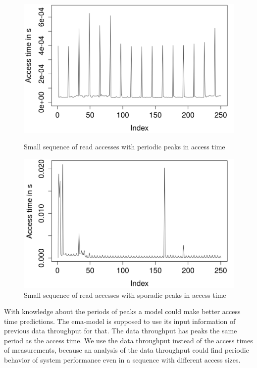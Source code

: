 \documentclass{superfri}
\begin{document}
	\begin{figure}[t]
		\centering
		\begin{minipage}[b]{0.47\textwidth}
			\includegraphics[width=\textwidth]{src/periodic_peaks.png}
			\caption{Small sequence of read accesses with periodic peaks in access time}
			\label{periodic}
		\end{minipage}
		\hfill
		\begin{minipage}[b]{0.47\textwidth}
			\includegraphics[width=\textwidth]{src/sporadic_peaks.png}
			\caption{Small sequence of read accesses with sporadic peaks in access time}
			\label{sporadic}
		\end{minipage}
	\end{figure}
	With knowledge about the periods of peaks a model could make better access time predictions.
	The ema-model is supposed to use its input information of previous data throughput for that.
	The data throughput has peaks the same period as the access time. We use the data throughput instead of the access times of measurements, because an analysis of the data throughput could find periodic behavior of system performance even in a sequence with different access sizes. 
\end{document}
